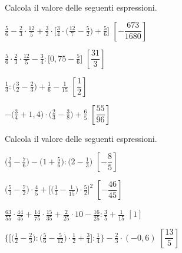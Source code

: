 \begin{esercizio}[\Ast]
\label{ese:3.144}
 Calcola il valore delle seguenti espressioni.
\begin{enumeratea}
\spazielenx
\item $\displaystyle{\frac{5}{6}-\frac{2}{3}\cdot\frac{12}{5}+\frac{3}{2}
\cdot\bigg[\frac{3}{4}\cdot%
\bigg(\frac{12}{7}-\frac{5}{2}\bigg)+\frac{5}{6}\bigg]}$
  \hfill \(\left[-\dfrac{673}{1680} \right]\)
\item $\displaystyle{\frac{5}{6}\cdot{\frac{2}{3}}\cdot\frac{12}{5}-
\frac{3}{4}:\bigg[0,75-\frac{5}{6}\bigg]}$
  \hfill \(\left[\dfrac{31}{3} \right]\)
\item $\displaystyle{\frac{1}{3}:\bigg(\frac{3}{2}-\frac{2}{3}\bigg)+
\frac{1}{6}-\frac{1}{15}}$
  \hfill \(\left[\dfrac{1}{2} \right]\)
\item $\displaystyle{-\bigg(\frac{3}{4}+1,4\bigg)\cdot\bigg(\frac{2}{3}-
\frac{3}{8}\bigg)+\frac{6}{5}}$
  \hfill \(\left[\dfrac{55}{96} \right]\)
\end{enumeratea}
\end{esercizio}

\begin{esercizio}[\Ast]
\label{ese:3.145}
 Calcola il valore delle seguenti espressioni.
\begin{enumeratea}
\spazielenx
\item $\displaystyle{\bigg(\frac{2}{3}-\frac{7}{6}\bigg)-\bigg(1+
\frac{5}{6}\bigg):\bigg(2-\frac{1}{3}\bigg)}$
  \hfill \(\left[-\dfrac{8}{5} \right]\)
\item $\displaystyle{\bigg(\frac{5}{3}-\frac{7}{2}\bigg)\cdot\frac{4}{5}+
\bigg[\bigg(\frac{1}{3}-\frac{1}{15}\bigg)%
\cdot\frac{5}{2}\bigg]^{2}}$
  \hfill \(\left[-\dfrac{46}{45} \right]\)
\item $\displaystyle{\frac{63}{55}\cdot\frac{44}{45}+\frac{14}{75}\cdot
\frac{15}{35}+\frac{2}{25}\cdot%
10-\frac{16}{25}:\frac{3}{5}+\frac{1}{15}}$
  \hfill \(\left[1 \right]\)
\item $\displaystyle{\bigg\{\bigg[\bigg(\frac{1}{2}-\frac{2}{3}\bigg):
\bigg(\frac{5}{6}-\frac{5}{12}\bigg)\cdot%
\frac{1}{2}+\frac{3}{4}\bigg]:\frac{1}{4}\bigg\}-\frac{2}{3}\cdot(-0,6)}$
  \hfill \(\left[\dfrac{13}{5} \right]\)
\end{enumeratea}
\end{esercizio}

